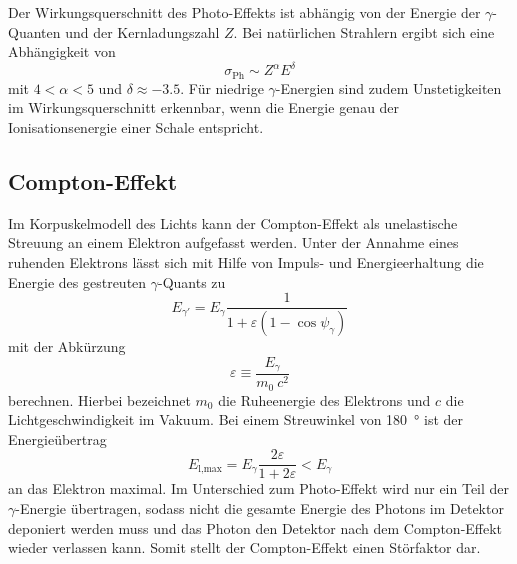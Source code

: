 Der Wirkungsquerschnitt des Photo-Effekts ist abhängig von der Energie der
$\gamma$-Quanten und der Kernladungszahl $Z$.
Bei natürlichen Strahlern ergibt sich eine Abhängigkeit von
\begin{equation*}
	\sigma_\text{Ph} \sim Z^\alpha E^\delta
\end{equation*}
mit $4 < \alpha < 5$ und $\delta \approx \num{-3.5}$.
Für niedrige $\gamma$-Energien sind zudem Unstetigkeiten im Wirkungsquerschnitt
erkennbar, wenn die Energie genau der Ionisationsenergie einer Schale entspricht.

\subsection{Compton-Effekt}
\label{sec:Compton-Effekt}

Im Korpuskelmodell des Lichts kann der Compton-Effekt als unelastische
Streuung an einem Elektron aufgefasst werden.
Unter der Annahme eines ruhenden Elektrons lässt sich mit Hilfe von Impuls-
und Energieerhaltung die Energie des gestreuten $\gamma$-Quants zu
\begin{equation}
	E_{\gamma'} = E_\gamma
	\frac{1}{1 + \varepsilon \left(1 - \cos \psi_\gamma\right)}
	\label{eqn:Compton-Energy}
\end{equation}
mit der Abkürzung
\begin{equation*}
	\varepsilon \equiv \frac{E_\gamma}{m_\text{0}\:c^2}
\end{equation*}
berechnen.
Hierbei bezeichnet $m_0$ die Ruheenergie des Elektrons und
$c$ die Lichtgeschwindigkeit im Vakuum.
Bei einem Streuwinkel von \SI{180}{\degree} ist der Energieübertrag
\begin{equation*}
	E_\text{l,max} = E_\gamma \frac{2 \varepsilon}{1 + 2 \varepsilon} < E_\gamma
\end{equation*}
an das Elektron maximal.
Im Unterschied zum Photo-Effekt wird nur ein Teil der $\gamma$-Energie übertragen,
sodass nicht die gesamte Energie des Photons im Detektor deponiert werden muss und
das Photon den Detektor nach dem Compton-Effekt wieder verlassen kann.
Somit stellt der Compton-Effekt einen Störfaktor dar.

